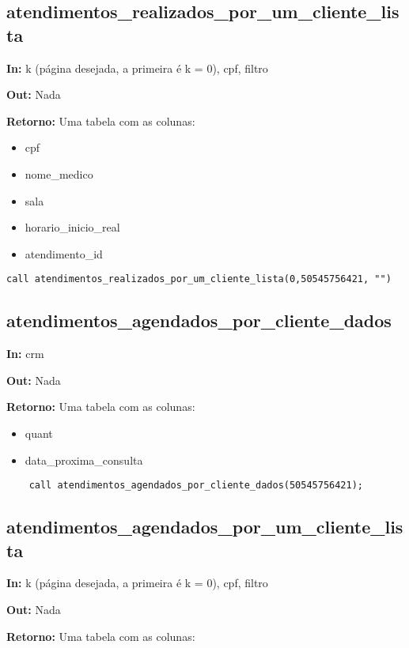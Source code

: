 \subsection{atendimentos\_realizados\_por\_um\_cliente\_lista}

\textbf{In:} k (página desejada, a primeira é k = 0), cpf, filtro

\textbf{Out:} Nada

\textbf{Retorno:} Uma tabela com as colunas:

\begin{itemize}
	\item cpf
	\item nome\_medico
	\item sala
	\item horario\_inicio\_real
	\item atendimento\_id
\end{itemize}

\begin{verbatim}
call atendimentos_realizados_por_um_cliente_lista(0,50545756421, "")
\end{verbatim}

\subsection{atendimentos\_agendados\_por\_cliente\_dados}

\textbf{In:} crm

\textbf{Out:} Nada

\textbf{Retorno:} Uma tabela com as colunas:

\begin{itemize}
	\item quant
	\item data\_proxima\_consulta
\end{itemize}

\begin{verbatim}
	call atendimentos_agendados_por_cliente_dados(50545756421);
\end{verbatim}

\subsection{atendimentos\_agendados\_por\_um\_cliente\_lista}

\textbf{In:} k (página desejada, a primeira é k = 0), cpf, filtro

\textbf{Out:} Nada

\textbf{Retorno:} Uma tabela com as colunas:

